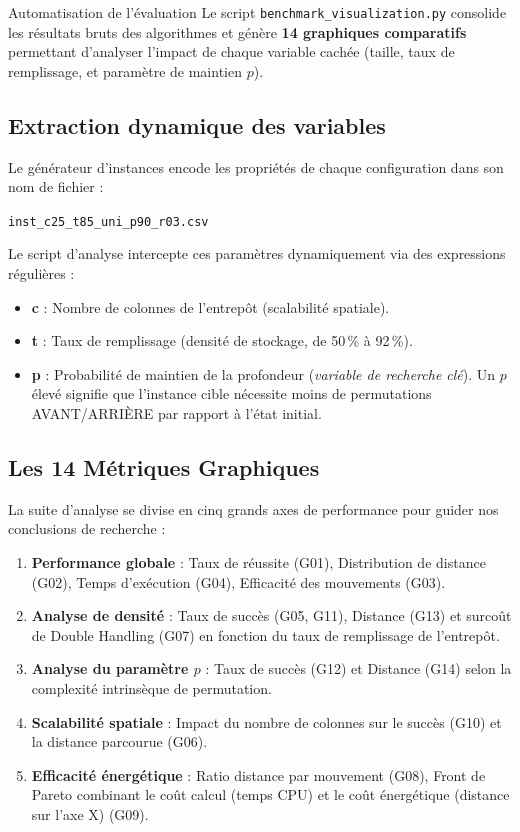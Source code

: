 \documentclass[12pt,a4paper]{article}
\begin{document}
\begin{boxInfo}{Automatisation de l'évaluation}
Le script \texttt{benchmark\_visualization.py} consolide les résultats bruts des algorithmes et génère \textbf{14 graphiques comparatifs} permettant d'analyser l'impact de chaque variable cachée (taille, taux de remplissage, et paramètre de maintien $p$).
\end{boxInfo}

\subsection{Extraction dynamique des variables}

Le générateur d'instances encode les propriétés de chaque configuration dans son nom de fichier :
\begin{center}
\texttt{inst\_c25\_t85\_uni\_p90\_r03.csv}
\end{center}
Le script d'analyse intercepte ces paramètres dynamiquement via des expressions régulières :
\begin{itemize}[noitemsep]
  \item \textbf{c} : Nombre de colonnes de l'entrepôt (scalabilité spatiale).
  \item \textbf{t} : Taux de remplissage (densité de stockage, de 50\,\% à 92\,\%).
  \item \textbf{p} : Probabilité de maintien de la profondeur (\textit{variable de recherche clé}). Un $p$ élevé signifie que l'instance cible nécessite moins de permutations AVANT/ARRIÈRE par rapport à l'état initial.
\end{itemize}

\subsection{Les 14 Métriques Graphiques}

La suite d'analyse se divise en cinq grands axes de performance pour guider nos conclusions de recherche :
\begin{enumerate}[noitemsep]
  \item \textbf{Performance globale} : Taux de réussite (G01), Distribution de distance (G02), Temps d'exécution (G04), Efficacité des mouvements (G03).
  \item \textbf{Analyse de densité} : Taux de succès (G05, G11), Distance (G13) et surcoût de Double Handling (G07) en fonction du taux de remplissage de l'entrepôt.
  \item \textbf{Analyse du paramètre $p$} : Taux de succès (G12) et Distance (G14) selon la complexité intrinsèque de permutation.
  \item \textbf{Scalabilité spatiale} : Impact du nombre de colonnes sur le succès (G10) et la distance parcourue (G06).
  \item \textbf{Efficacité énergétique} : Ratio distance par mouvement (G08), Front de Pareto combinant le coût calcul (temps CPU) et le coût énergétique (distance sur l'axe X) (G09).
\end{enumerate}
\end{document}
